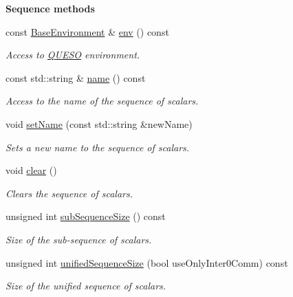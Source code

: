 \begin{Indent}{\bf Sequence methods}\par
\begin{DoxyCompactItemize}
\item 
const \hyperlink{class_q_u_e_s_o_1_1_base_environment}{Base\-Environment} \& \hyperlink{class_q_u_e_s_o_1_1_scalar_sequence_a78095426a715b7a735919044927f49fe}{env} () const 
\begin{DoxyCompactList}\small\item\em Access to \hyperlink{namespace_q_u_e_s_o}{Q\-U\-E\-S\-O} environment. \end{DoxyCompactList}\item 
const std\-::string \& \hyperlink{class_q_u_e_s_o_1_1_scalar_sequence_ad3e65b63cff35a52d5d78bf9ae6bfa8d}{name} () const 
\begin{DoxyCompactList}\small\item\em Access to the name of the sequence of scalars. \end{DoxyCompactList}\item 
void \hyperlink{class_q_u_e_s_o_1_1_scalar_sequence_a198b72423333bc5aa1722b830b64a263}{set\-Name} (const std\-::string \&new\-Name)
\begin{DoxyCompactList}\small\item\em Sets a new name to the sequence of scalars. \end{DoxyCompactList}\item 
void \hyperlink{class_q_u_e_s_o_1_1_scalar_sequence_aa5449ca2f03f5e6025d35804bee19ee0}{clear} ()
\begin{DoxyCompactList}\small\item\em Clears the sequence of scalars. \end{DoxyCompactList}\item 
unsigned int \hyperlink{class_q_u_e_s_o_1_1_scalar_sequence_a0288ea295eedc216a1617b3286f6f3a0}{sub\-Sequence\-Size} () const 
\begin{DoxyCompactList}\small\item\em Size of the sub-\/sequence of scalars. \end{DoxyCompactList}\item 
unsigned int \hyperlink{class_q_u_e_s_o_1_1_scalar_sequence_a52829afc95e5c36e9db44f40854153b0}{unified\-Sequence\-Size} (bool use\-Only\-Inter0\-Comm) const 
\begin{DoxyCompactList}\small\item\em Size of the unified sequence of scalars. \end{DoxyCompactList}\item 

\end{DoxyCompactItemize}
\end{Indent}

